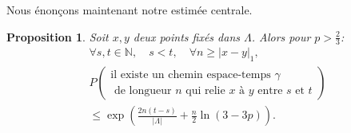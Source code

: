 \documentclass[titlepage,a4paper,12pt]{article}
\newcounter{d}
\newcounter{t}
\newcounter{p}
\newcounter{c}
\newcounter{a}
\newcounter{l}
\newtheorem{prop}[p]{Proposition}
\begin{document}
Nous énonçons maintenant notre estimée centrale.
\begin{prop} Soit 
$x,y$ deux points fixés dans $\Lambda$. Alors pour $p>\frac{2}{3}$:
\begin{multline*}\forall s,t \in \mathbb{N}, \quad s<t, \quad \forall n \geqslant |x-y|_1,\\ P\left(\begin{array}{c}
\text{il existe un chemin espace-temps }\gamma\\ \text{ de longueur } n\text{ qui relie }x\text{ à }y \text{ entre }s\text{ et }t
\end{array}\right)\\  \leqslant \exp\left(\frac{2n(t-s)}{|\Lambda|}+\frac{n}{2}\ln(3-3p)\right).
\end{multline*}
\end{prop}
\end{document}
